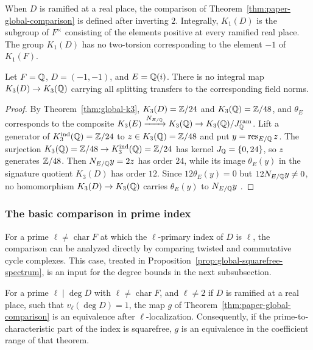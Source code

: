 When $D$ is ramified at a real place, the comparison of Theorem~\ref{thm:paper-global-comparison} is defined after inverting $2$.
Integrally, $K_1(D)$ is the subgroup of $F^\times$ consisting of the elements positive at every ramified real place.
The group $K_1(D)$ has no two-torsion corresponding to the element $-1$ of $K_1(F)$.
\begin{example}\label{ex:paper-global-k3-real-ramification}
Let $F=\mathbb Q$, $D=(-1,-1)$, and $E=\mathbb Q(i)$.
There is no integral map $K_3(D)\to K_3(\mathbb Q)$ carrying all splitting transfers to the corresponding field norms.
\end{example}
\begin{proof}
By Theorem~\ref{thm:global-k3}, $K_3(D)=\mathbb Z/24$ and $K_3(\mathbb Q)=\mathbb Z/48$, and $\theta_E$ corresponds to the composite $K_3(E)\xrightarrow{N_{E/\mathbb Q}}K_3(\mathbb Q)\to K_3(\mathbb Q)/J_{\mathbb Q}^{\mathrm{ram}}$.
Lift a generator of $K_3^{\mathrm{ind}}(\mathbb Q)=\mathbb Z/24$ to $z\in K_3(\mathbb Q)=\mathbb Z/48$ and put $y=\operatorname{res}_{E/\mathbb Q}z$.
The surjection $K_3(\mathbb Q)=\mathbb Z/48\to K_3^{\mathrm{ind}}(\mathbb Q)=\mathbb Z/24$ has kernel $J_{\mathbb Q}=\{0,24\}$, so $z$ generates $\mathbb Z/48$.
Then $N_{E/\mathbb Q}y=2z$ has order $24$, while its image $\theta_E(y)$ in the signature quotient $K_3(D)$ has order $12$.
Since $12\theta_E(y)=0$ but $12N_{E/\mathbb Q}y\ne0$, no homomorphism $K_3(D)\to K_3(\mathbb Q)$ carries $\theta_E(y)$ to $N_{E/\mathbb Q}y$ \cite[\S11]{MerkurjevSuslinK3}.
\end{proof}

\subsubsection{The basic comparison in prime index}
For a prime $\ell\ne\operatorname{char}F$ at which the $\ell$-primary index of $D$ is $\ell$, the comparison can be analyzed directly by comparing twisted and commutative cycle complexes.
This case, treated in Proposition~\ref{prop:global-squarefree-spectrum}, is an input for the degree bounds in the next subsubsection.

\begin{proposition}\label{prop:global-squarefree-spectrum}
For a prime $\ell\mid \deg D$ with $\ell\ne\operatorname{char}F$, and $\ell\ne2$ if $D$ is ramified at a real place, such that $v_\ell(\deg D)=1$, the map $g$ of Theorem~\ref{thm:paper-global-comparison} is an equivalence after $\ell$-localization.
Consequently, if the prime-to-characteristic part of the index is squarefree, $g$ is an equivalence in the coefficient range of that theorem.
\end{proposition}

